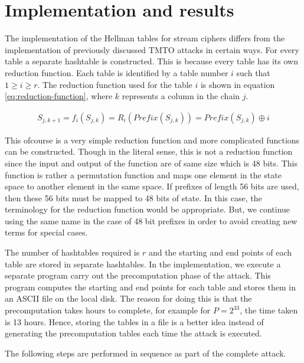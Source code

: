 \section{Implementation and results}
\label{sec:hellman-table-impl}

The implementation of the Hellman tables for stream ciphers differs from the implementation of previously discussed TMTO attacks in certain ways. For every table a separate hashtable is constructed. This is because every table has its own reduction function. Each table is identified by a table number $i$ such that $1 \geq i \geq r$. The reduction function used for the table $i$ is shown in equation \ref{eq:reduction-function}, where $k$ represents a column in the chain $j$.

\begin{align}
\label{eq:reduction-function} S_{j,k+1} = f_i(S_{j,k}) = R_i(Prefix(S_{j,k})) = Prefix(S_{j,k}) \oplus i
\end{align}  

This ofcourse is a very simple reduction function and more complicated functions can be constructed. Though in the literal sense, this is not a reduction function since the input and output of the function are of same size which is 48 bits. This function is rather a permutation function and maps one element in the state space to another element in the same space. If prefixes of length 56 bits are used, then these 56 bits must be mapped to 48 bits of state. In this case, the terminology for the reduction function would be appropriate. But, we continue using the same name in the case of 48 bit prefixes in order to avoid creating new terms for special cases. 

The number of hashtables required is $r$ and the starting and end points of each table are stored in separate hashtables. In the implementation, we execute a separate program carry out the precomputation phase of the attack. This program computes the starting and end points for each table and stores them in an ASCII file on the local disk. The reason for doing this is that the precomputation takes hours to complete, for example for $P = 2^{33}$, the time taken is 13 hours. Hence, storing the tables in a file is a better idea instead of generating the precomputation tables each time the attack is executed.

The following steps are performed in sequence as part of the complete attack. 

